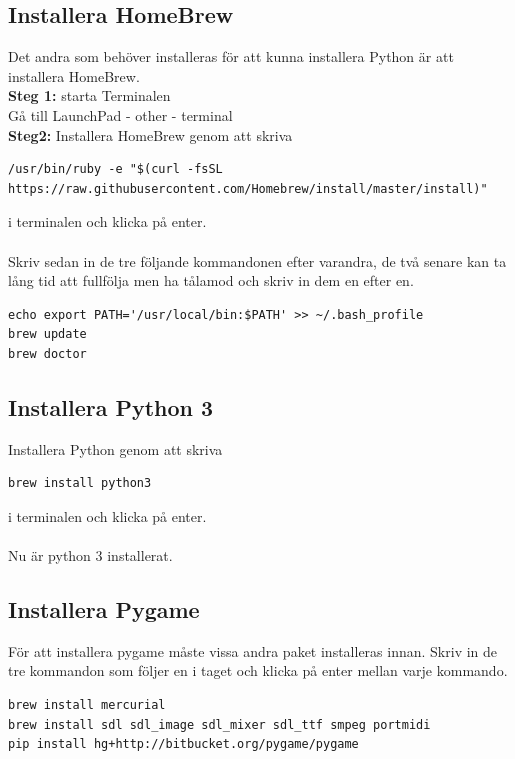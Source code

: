 \documentclass{article}
\begin{document}
\subsection{Installera HomeBrew}
Det andra som behöver installeras för att kunna installera Python är att installera HomeBrew.\\
\textbf{Steg 1:} starta Terminalen\\
Gå till LaunchPad - other - terminal\\
\textbf{Steg2:} Installera HomeBrew genom att skriva 
\begin{lstlisting}
/usr/bin/ruby -e "$(curl -fsSL https://raw.githubusercontent.com/Homebrew/install/master/install)"
\end{lstlisting}
i terminalen och klicka på enter.\\
\\
Skriv sedan in de tre följande kommandonen efter varandra, de två senare kan ta lång tid att fullfölja men ha tålamod och skriv in dem en efter en.
\begin{lstlisting}
echo export PATH='/usr/local/bin:$PATH' >> ~/.bash_profile
brew update
brew doctor
\end{lstlisting}
\subsection{Installera Python 3}
Installera Python genom att skriva 
\begin{lstlisting}
brew install python3
\end{lstlisting}
i terminalen och klicka på enter.\\
\\
Nu är python 3 installerat.
\subsection{Installera Pygame}
För att installera pygame måste vissa andra paket installeras innan. Skriv in de tre kommandon som följer en i taget och klicka på enter mellan varje kommando.
\begin{lstlisting}
brew install mercurial
brew install sdl sdl_image sdl_mixer sdl_ttf smpeg portmidi
pip install hg+http://bitbucket.org/pygame/pygame
\end{lstlisting}
\end{document}
